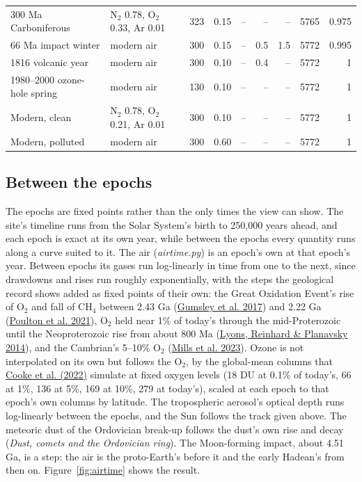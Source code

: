 \documentclass[9pt,twocolumn]{extarticle}
\begin{document}
\begin{table}[tp]
\begin{tabularx}{\textwidth}{@{}lYrrrrrrr@{}}
300 Ma Carboniferous & N$_2$ 0.78, O$_2$ 0.33, Ar 0.01 & 323 & 0.15 & -- & -- & -- & 5765 & 0.975 \\
66 Ma impact winter & modern air & 300 & 0.15 & -- & 0.5 & 1.5 & 5772 & 0.995 \\
1816 volcanic year & modern air & 300 & 0.10 & -- & 0.4 & -- & 5772 & 1 \\
1980--2000 ozone-hole spring & modern air & 130 & 0.10 & -- & -- & -- & 5772 & 1 \\
Modern, clean & N$_2$ 0.78, O$_2$ 0.21, Ar 0.01 & 300 & 0.10 & -- & -- & -- & 5772 & 1 \\
Modern, polluted & modern air & 300 & 0.60 & -- & -- & -- & 5772 & 1 \\
\bottomrule\end{tabularx}
\end{table}


\subsection{Between the epochs}\label{method-time}

The epochs are fixed points rather than the only times the view can show. The site's timeline runs from the Solar System's birth to 250,000 years ahead, and each epoch is exact at its own year, while between the epochs every quantity runs along a curve suited to it. The air (\emph{airtime.py}) is an epoch's own at that epoch's year. Between epochs its gases run log-linearly in time from one to the next, since drawdowns and rises run roughly exponentially, with the steps the geological record shows added as fixed points of their own: the Great Oxidation Event's rise of O$_2$ and fall of CH$_4$ between 2.43 Ga (\protect\hyperlink{cite.gumsley2017}{Gumsley et al. 2017}) and 2.22 Ga (\protect\hyperlink{cite.poulton2021}{Poulton et al. 2021}), O$_2$ held near 1\% of today's through the mid-Proterozoic until the Neoproterozoic rise from about 800 Ma (\protect\hyperlink{cite.lyons2014}{Lyons, Reinhard \& Planavsky 2014}), and the Cambrian's 5--10\% O$_2$ (\protect\hyperlink{cite.mills2023}{Mills et al. 2023}). Ozone is not interpolated on its own but follows the O$_2$, by the global-mean columns that \protect\hyperlink{cite.cooke2021}{Cooke et al. (2022)} simulate at fixed oxygen levels (18 DU at 0.1\% of today's, 66 at 1\%, 136 at 5\%, 169 at 10\%, 279 at today's), scaled at each epoch to that epoch's own columns by latitude. The tropospheric aerosol's optical depth runs log-linearly between the epochs, and the Sun follows the track given above. The meteoric dust of the Ordovician break-up follows the dust's own rise and decay (\emph{Dust, comets and the Ordovician ring}). The Moon-forming impact, about 4.51 Ga, is a step: the air is the proto-Earth's before it and the early Hadean's from then on. Figure~\ref{fig:airtime} shows the result.
\end{document}

